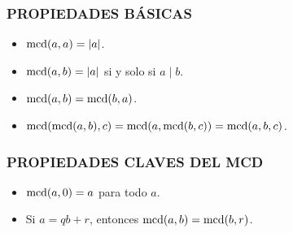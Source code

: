 \begin{frame}
  \frametitle{PROPIEDADES BÁSICAS}

  \begin{itemize}
  \item<2-> $\operatorname{mcd} (a,a) = |a|$.

  \item<3-> $\operatorname{mcd} (a,b) = |a|$ si y solo si $a\mid b$.

  \item<4-> $\operatorname{mcd} (a,b) = \operatorname{mcd} (b,a)$.

  \item<5-> $\operatorname{mcd} (\operatorname{mcd} (a,b), c) = \operatorname{mcd} (a, \operatorname{mcd} (b,c)) = \operatorname{mcd} (a,b,c)$.
  \end{itemize}

\end{frame}

\begin{frame}

  \vfill

  \begin{center}\huge\headingfont

    \vspace{1em}

  \end{center}

  \vfill
\end{frame}

\begin{frame}
  \frametitle{PROPIEDADES CLAVES DEL MCD}

  \begin{itemize}
  \item<2-> $\operatorname{mcd} (a,0) = a$ para todo $a$.


  \item<4-> Si $a = qb + r$, entonces $\operatorname{mcd} (a,b) = \operatorname{mcd} (b,r)$.

  \end{itemize}
\end{frame}

